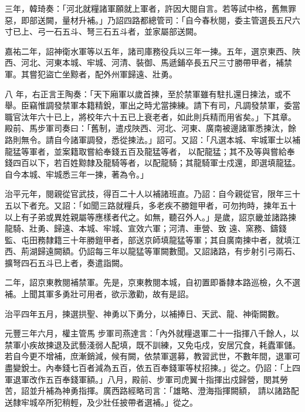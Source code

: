\begin{pinyinscope}
 三年，韓琦奏：「河北就糧諸軍願就上軍者，許因大閱自言。若等試中格，舊無罪惡，即部送闕，量材升補。」乃詔四路都總管司：「自今春秋閱，委主管選長五尺六寸已上、弓一石五斗、弩三石五斗者，並家屬部送闕。



 嘉祐二年，詔神衛水軍等以五年，諸司庫務役兵以三年一揀。五年，選京東西、陜西、河北、河東本城、牢城、河清、裝御、馬遞鋪卒長五尺三寸勝帶甲者，補禁軍。其嘗犯盜亡坐黥者，配外州軍歸遠、壯勇。



 八
 年，右正言王陶奏：「天下廂軍以歲首揀，至於禁軍雖有駐扎還日揀法，或不舉。臣竊惟調發禁軍本籍精銳，軍出之時尤當揀練。請下有司，凡調發禁軍，委當職官汰年六十已上，將校年六十五已上衰老者，如此則兵精而用省矣。」下其章。殿前、馬步軍司奏曰：「舊制，遣戍陜西、河北、河東、廣南被邊諸軍悉揀汰，餘路則無令。請自今諸軍調發，悉從揀法。」詔可。又詔：「凡選本城、牢城軍士以補龍猛等軍者，並案籍取嘗給奉錢五百及龍猛等者，
 以配龍猛；其不及等與嘗給奉錢四百以下，若百姓黥隸及龍騎等者，以配龍騎；其龍騎軍士戍還，即選填龍猛。自今本城、牢城悉三年一揀，著為令。」



 治平元年，閱親從官武技，得百二十人以補諸班直。乃詔：自今親從官，限年三十五以下者充。又詔：「如聞三路就糧兵，多老疾不勝鎧甲者，可勿拘時，揀年五十以上有子弟或異姓親屬等應樣者代之。如無，聽召外人。」是歲，詔京畿並諸路揀龍騎、壯勇、歸遠、本城、牢城、宣效六軍；河清、車營、致
 遠、窯務、鑄錢監、屯田務隸籍三十年勝鎧甲者，部送京師填龍猛等軍；其自廣南揀中者，就填江西、荊湖歸遠闕額。仍詔每三年以龍猛等軍闕數聞。又詔諸路，有步射引弓兩石、擴弩四石五斗已上者，奏遣詣闕。



 二年，詔京東教閱補禁軍。先是，京東教閱本城，自初置即番隸本路巡檢，久不選補。上聞其軍多勇壯可用者，欲示激勸，故有是詔。



 治平四年五月，揀選拱聖、神勇以下勇分，以補捧日、天武、龍、神衛闕數。



 元豐三年六月，權主管馬
 步軍司燕達言：「內外就糧退軍二十一指揮八千餘人，以禁軍小疾故揀退及武藝淺弱人配填，既不訓練，又免屯戍，安居冗食，耗蠹軍儲。若自今更不增補，庶漸銷減，候有闕，依禁軍選募，教習武世，不數年間，退軍可盡變銳士。內奉錢七百者減為五百，依五百奉錢軍等杖招揀。」從之。仍詔：「上四軍退軍改作五百奉錢軍額。」八月，殿前、步軍司虎翼十指揮出戍歸營，閔其勞苦，詔並升補為神勇指揮。廣西路經略司言：「雄略、澄海指揮闕額，
 請以諸路配送隸牢城卒所犯稍輕，及少壯任披帶者選補。」從之。




\end{pinyinscope}
